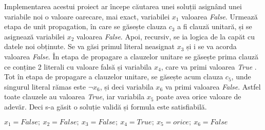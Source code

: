 Implementarea acestui proiect ar începe căutarea unei soluții asignând unei variabile noi o valoare oarecare, mai exact, variabilei $x_1$ valoarea \textit{False}. Urmează etapa de unit propagation, în care se găsește clauza $c_3$ a fi clauză unitară, și se asignează \linebreak variabilei $x_2$ valoarea \textit{False}.
Apoi, recursiv, se ia logica de la capăt cu datele noi obținute. Se va găsi primul literal neasignat $x_3$ și i se va acorda valoarea \textit{False}. În etapa de propagare a clauzelor unitare se găsește prima clauză ce conține 2 literali cu valoare falsă și variabila $x_4$, care va primi valoarea \textit{ True }. Tot în etapa de propagare a clauzelor unitare, se găsește acum clauza $c_5$, unde singurul literal rămas este $\neg x_6$, și deci variabila $x_6$ va primi valoarea \textit{False}. Astfel toate clauzele au valoarea \textit{True}, iar variabila $x_5$ poate avea orice valoare de adevăr. Deci s-a găsit o soluție validă și formula este satisfiabilă.

$x_1 = False ;~ x_2 = False ;~ x_3 = False ;~ x_4 =  True  ; ~x_5 = orice ;~ x_6 = False$

